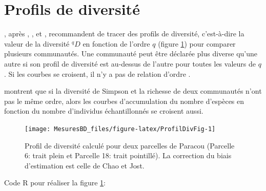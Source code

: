 \documentclass[
  11pt,
  french,
  a4paper,
  extrafontsizes,onecolumn,openright
  ]{memoir}
\newenvironment{Shaded}{\begin{snugshade}}{\end{snugshade}}
\newcommand{\AttributeTok}[1]{\textcolor[rgb]{0.13,0.29,0.53}{#1}}
\newcommand{\DecValTok}[1]{\textcolor[rgb]{0.00,0.00,0.81}{#1}}
\newcommand{\FunctionTok}[1]{\textcolor[rgb]{0.13,0.29,0.53}{\textbf{#1}}}
\newcommand{\NormalTok}[1]{#1}
\newcommand{\OtherTok}[1]{\textcolor[rgb]{0.56,0.35,0.01}{#1}}
\newcommand{\SpecialCharTok}[1]{\textcolor[rgb]{0.81,0.36,0.00}{\textbf{#1}}}
\newcommand{\StringTok}[1]{\textcolor[rgb]{0.31,0.60,0.02}{#1}}
\begin{document}
\section{Profils de diversité}\label{profils-de-diversituxe9}

\textcite{Leinster2012}, après \textcite{Hill1973}, \textcite{Patil1982}, \textcite{Tothmeresz1995} et \textcite{Kindt2006}, recommandent de tracer des profils de diversité, c'est-à-dire la valeur de la diversité \(^{q}\!D\) en fonction de l'ordre \(q\) (figure \ref{fig:ProfilDivFig}) pour comparer plusieurs communautés.
Une communauté peut être déclarée plus diverse qu'une autre si son profil de diversité est au-dessus de l'autre pour toutes les valeurs de \(q\).
Si les courbes se croisent, il n'y a pas de relation d'ordre \autocite{Tothmeresz1995}.

\textcite{Lande2000} montrent que si la diversité de Simpson et la richesse de deux communautés n'ont pas le même ordre, alors les courbes d'accumulation du nombre d'espèces en fonction du nombre d'individus échantillonnés se croisent aussi.



\scriptsize

\begin{figure}

{\centering \texttt{[image: MesuresBD\_files/figure-latex/ProfilDivFig-1]} 

}

\caption{Profil de diversité calculé pour deux parcelles de Paracou (Parcelle 6: trait plein et Parcelle 18: trait pointillé). La correction du biais d'estimation est celle de Chao et Jost.}\label{fig:ProfilDivFig}
\end{figure}

\normalsize

Code R pour réaliser la figure \ref{fig:ProfilDivFig}:

\scriptsize

\begin{Shaded}
\end{Shaded}
\end{document}
